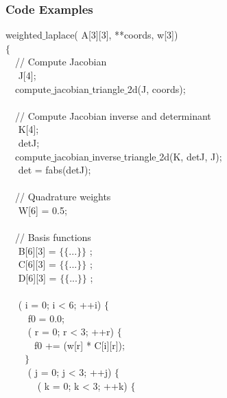 \subsubsection{Code Examples}
\label{sec:bkg:mathcode}

\begin{algorithm}[h]
\scriptsize\ttfamily
{}

 weighted$\_$laplace( A[3][3],  **coords,  w[3]) \\
$\lbrace$ \\
~~// Compute Jacobian \\
~~ J[4]; \\
~~compute$\_$jacobian$\_$triangle$\_$2d(J, coords); \\
~~\\
~~// Compute Jacobian inverse and determinant \\
~~ K[4]; \\
~~ detJ; \\
~~compute$\_$jacobian$\_$inverse$\_$triangle$\_$2d(K, detJ, J); \\
~~ det = fabs(detJ); \\
~~\\
~~// Quadrature weights \\
~~ W[6] = {0.5}; \\
~~\\
~~// Basis functions \\
~~ B[6][3] = $\lbrace\lbrace$...$\rbrace\rbrace$ ;\\
~~ C[6][3] = $\lbrace\lbrace$...$\rbrace\rbrace$ ;\\
~~ D[6][3] = $\lbrace\lbrace$...$\rbrace\rbrace$ ;\\
~~\\
~~ ( i = 0; i < 6; ++i) $\lbrace$ \\
~~~~ f0  = 0.0;\\
~~~~ ( r  = 0; r < 3; ++r) $\lbrace$ \\
~~~~~~f0 += (w[r] * C[i][r]);\\
~~~~$\rbrace$ \\
~~~~ ( j = 0; j < 3; ++j) $\lbrace$\\
~~~~~~ ( k = 0; k < 3; ++k) $\lbrace$\\

\end{algorithm}
